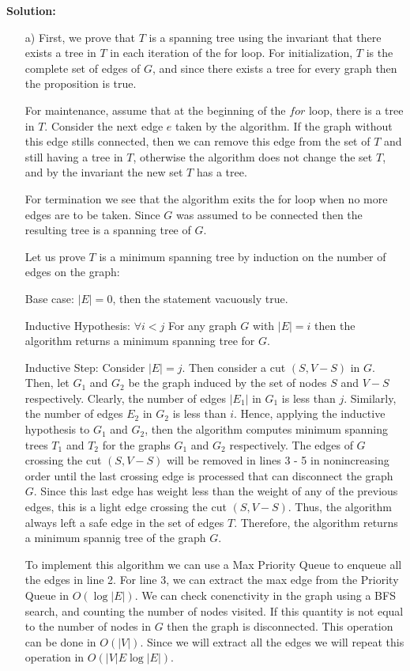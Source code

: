 \documentclass[a4paper, 11pt]{article}
\newcommand{\solution}{\textbf{Solution:}}
\begin{document}
\solution

\begin{itemize}
	\item [a)] First, we prove that $T$ is a spanning tree using the invariant that there exists a tree in $T$ in each iteration of the for loop. For initialization, $T$ is the complete set of edges of $G$, and since there exists a tree for every graph then the proposition is true. 

	For maintenance, assume that at the beginning of the $for$ loop, there is a tree in $T$. Consider the next edge $e$ taken by the algorithm. If the graph without this edge stills connected, then we can remove this edge from the set of $T$ and still having a tree in $T$, otherwise the algorithm does not change the set $T$, and by the invariant the new set $T$ has a  tree. 

	For termination we see that the algorithm exits the for loop when no more edges are to be taken. Since $G$ was assumed to be connected then the resulting tree is a spanning tree of $G$. 

	Let us prove $T$ is a minimum spanning tree by induction on the number of edges on the graph:

	Base case: $|E| = 0$, then the statement vacuously true.

	Inductive Hypothesis: $\forall i < j$ For any graph $G$ with $|E| = i$ then the algorithm returns a minimum spanning tree for $G$.

	Inductive Step: Consider $|E| = j$. Then consider a cut $(S, V - S)$ in $G$. Then, let $G_1$ and $G_2$ be the graph induced by the set of nodes $S$ and $V - S$ respectively. Clearly, the number of edges $|E_1|$ in $G_1$ is less than $j$. Similarly, the number of edges $E_2$ in $G_2$ is less than $i$. Hence, applying the inductive hypothesis to $G_1$ and $G_2$, then the algorithm computes minimum spanning trees $T_1$ and $T_2$ for the graphs $G_1$ and $G_2$ respectively. The edges of $G$ crossing the cut $(S, V - S)$ will be removed in lines 3 - 5 in nonincreasing order until the last crossing edge is processed that can disconnect the graph $G$. Since this last edge has weight less than the weight of any of the previous edges, this is a light edge crossing the cut $(S, V - S)$. Thus, the algorithm always left a safe edge in the set of edges $T$. Therefore, the algorithm returns a minimum spannig tree of the graph $G$.

	To implement this algorithm we can use a Max Priority Queue to enqueue all the edges in line 2. For line 3, we can extract the max edge from the Priority Queue in $O(\log |E|)$. We can check conenctivity in the graph using a BFS search, and counting the number of nodes visited. If this quantity is not equal to the number of nodes in $G$ then the graph is disconnected. This operation can be done in $O(|V|)$. Since we will extract all the edges we will repeat this operation in $O(|V| E \log |E|)$.


\end{itemize}
\end{document}
